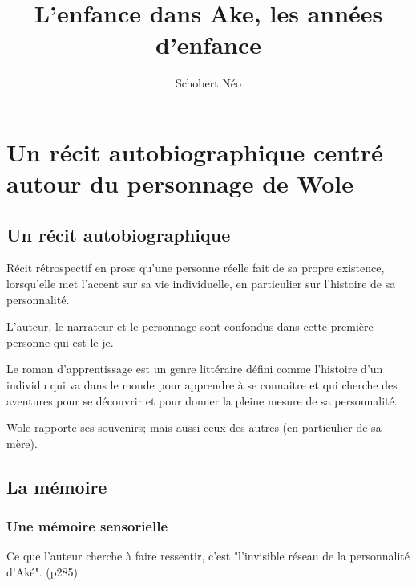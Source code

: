 \documentclass[a4paper, 11pt, hidelinks]{article}
\newcommand{\bs}{\bigskip}
\begin{document}
\title{L'enfance dans Ake, les années d'enfance}
\author{Schobert Néo}

\maketitle

\tableofcontents


\newpage




\section{Un récit autobiographique centré autour du personnage de Wole}


\subsection{Un récit autobiographique}


Récit rétrospectif en prose qu'une personne réelle fait de sa propre existence, lorsqu'elle met l'accent sur sa vie individuelle,
en particulier sur l'histoire de sa personnalité.

L'auteur, le narrateur et le personnage sont confondus dans cette première personne qui est le je.


Le roman d'apprentissage est un genre littéraire défini comme l'histoire d'un individu qui va dans le monde pour apprendre à se connaitre
et qui cherche des aventures pour se découvrir et pour donner la pleine mesure de sa personnalité.

Wole rapporte ses souvenirs; mais aussi ceux des autres (en particulier de sa mère).







\subsection{La mémoire}

\subsubsection{Une mémoire sensorielle}



Ce que l'auteur cherche à faire ressentir, c'est "l'invisible réseau de la personnalité d'Aké". (p285)

\bs
\end{document}

